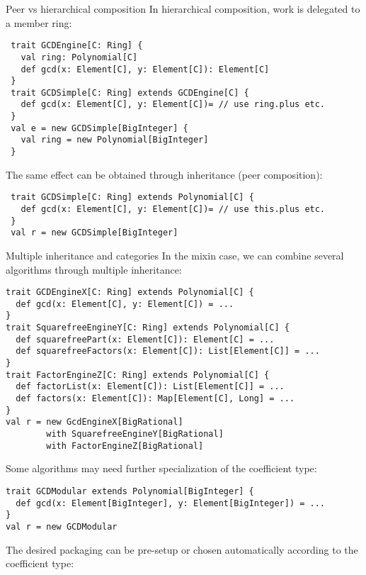 \documentclass[final]{beamer}
\begin{document}
\begin{frame}[fragile]
\begin{columns}[t]
\begin{column}{.3\linewidth}
  \begin{block}{\large Peer vs hierarchical composition}
\tiny %
{\footnotesize In hierarchical composition, work is delegated to
a member ring:}\par
\begin{lstlisting}
 trait GCDEngine[C: Ring] {
   val ring: Polynomial[C]
   def gcd(x: Element[C], y: Element[C]): Element[C]
 }
 trait GCDSimple[C: Ring] extends GCDEngine[C] {
   def gcd(x: Element[C], y: Element[C])= // use ring.plus etc.
 }
 val e = new GCDSimple[BigInteger] {
   val ring = new Polynomial[BigInteger]
 }
\end{lstlisting}
{\footnotesize The same effect can be obtained through inheritance
(peer composition):}\par
\begin{lstlisting}
 trait GCDSimple[C: Ring] extends Polynomial[C] {
   def gcd(x: Element[C], y: Element[C])= // use this.plus etc.
 }
 val r = new GCDSimple[BigInteger]
\end{lstlisting}
  \end{block}
  \hfill
  \begin{block}{\large Multiple inheritance and categories}
\tiny %
{\footnotesize In the mixin case, we can combine several
algorithms through multiple inheritance:}\par
\begin{lstlisting}
trait GCDEngineX[C: Ring] extends Polynomial[C] {
  def gcd(x: Element[C], y: Element[C]) = ...
}
trait SquarefreeEngineY[C: Ring] extends Polynomial[C] {
  def squarefreePart(x: Element[C]): Element[C] = ...
  def squarefreeFactors(x: Element[C]): List[Element[C]] = ...
}
trait FactorEngineZ[C: Ring] extends Polynomial[C] {
  def factorList(x: Element[C]): List[Element[C]] = ...
  def factors(x: Element[C]): Map[Element[C], Long] = ...
}
val r = new GcdEngineX[BigRational] 
        with SquarefreeEngineY[BigRational]
        with FactorEngineZ[BigRational]
\end{lstlisting}
{\footnotesize Some algorithms may need further specialization
of the coefficient type:}\par
\begin{lstlisting}
trait GCDModular extends Polynomial[BigInteger] {
  def gcd(x: Element[BigInteger], y: Element[BigInteger]) = ...
}
val r = new GCDModular
\end{lstlisting}
{\footnotesize The desired packaging can be pre-setup or chosen
automatically according to the coefficient type:}\par

\end{block}
\end{column}
\end{columns}
\end{frame}
\end{document}
